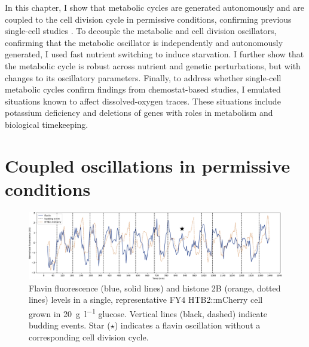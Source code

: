 In this chapter, I show that metabolic cycles are generated autonomously and are coupled to the cell division cycle in permissive conditions, confirming previous single-cell studies \parencite{papagiannakisAutonomousMetabolicOscillations2017,ozsezenInferenceHighLevelInteraction2019}.
To decouple the metabolic and cell division oscillators, confirming that the metabolic oscillator is independently and autonomously generated, I used fast nutrient switching to induce starvation.
I further show that the metabolic cycle is robust across nutrient and genetic perturbations, but with changes to its oscillatory parameters.
Finally, to address whether single-cell metabolic cycles confirm findings from chemostat-based studies, I emulated situations known to affect dissolved-oxygen traces.
These situations include potassium deficiency and deletions of genes with roles in metabolism and biological timekeeping.


\section{Coupled oscillations in permissive conditions}
\label{sec:biology-sync}

\begin{figure}
  \centering
    \includegraphics[width=1.0\linewidth]{single_birth_plot_edit.pdf}
    \caption[
      Flavin fluorescence and histone 2B levels in a single, representative FY4 HTB2::mCherry cell grown in \SI{20}{\gram~\litre^{-1}} glucose.
    ]{
      Flavin fluorescence (blue, solid lines) and histone 2B (orange, dotted lines) levels in a single, representative FY4 HTB2::mCherry cell grown in \SI{20}{\gram~\litre^{-1}} glucose.
      Vertical lines (black, dashed) indicate budding events.
      Star ($\star$) indicates a flavin oscillation without a corresponding cell division cycle.
    }
  \label{fig:biology-highglc-single}
\end{figure}


